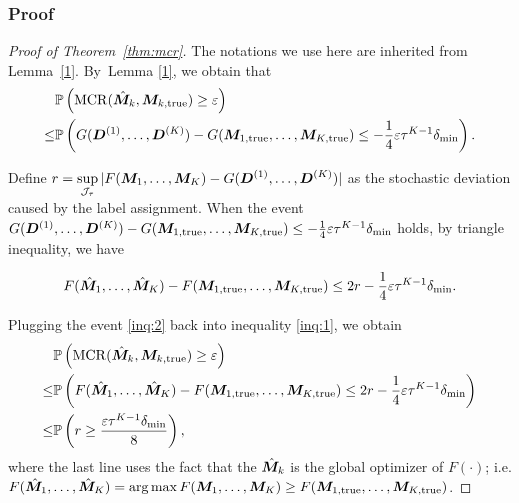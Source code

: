 \documentclass{article}
\DeclareMathOperator*{\mcr}{MCR}
\begin{document}
\begin{appendices}
\subsubsection{Proof}
\begin{proof}[Proof of Theorem~\ref{thm:mcr}]
The notations we use here are inherited from Lemma~\ref{1}. By~Lemma \ref{1}, we obtain that
\begin{align}\label{inq:1}
   &\mathbb{P}\left(\mcr(\hat{\mM}_k, \mM_{k,\text{true}})\geq \varepsilon\right)\notag \\
\leq & \mathbb{P}\left(G(\mD^{(1)},\ldots,\mD^{(K)})-G(\mM_{1,\text{true}},\ldots,\mM_{K,\text{true}})\leq -\frac{1}{4}\varepsilon\tau^{K-1}\delta_{\min}\right).
\end{align}


Define $r=\displaystyle\sup_{\mathcal{J}_\tau} |F(\bm M_1,\ldots,\bm M_K)-G(\bm{D}^{(1)},\ldots,\bm{D}^{(K)})|$ as the stochastic deviation caused by the label assignment. When the event $G(\bm{D}^{(1)},\ldots,\bm{D}^{(K)})-G(\bm M_{1,\text{true}},\ldots,\bm M_{K,\text{true}})\leq -\frac{1}{4}\varepsilon\tau^{K-1}\delta_{\min}$ holds, by triangle inequality, we have

\begin{equation} \label{inq:2}
F(\hat{\bm M}_1,\ldots,\hat{\bm M}_K)-F(\bm M_{1,\text{true}},\ldots,\bm M_{K,\text{true}})\leq  2r-\frac{1}{4}\varepsilon\tau^{K-1}\delta_{\min}.
\end{equation}

Plugging the event \eqref{inq:2} back into inequality \eqref{inq:1}, we obtain
\begin{align}\label{inq:3}
    &\mathbb{P}\left(\mcr(\hat{\mM}_k, \mM_{k,\text{true}})\geq \varepsilon\right)\notag \\
    \leq & \mathbb{P}\left(F(\hat{\mM}_1,\ldots,\hat{\mM}_K)-F(\mM_{1,\text{true}},\ldots,\mM_{K,\text{true}})\leq 2r-\frac{1}{4}\varepsilon\tau^{K-1}\delta_{\min}\right)\notag \\
    \leq & \mathbb{P}\left(r \geq\frac{\varepsilon\tau^{K-1}\delta_{\min}}{8}\right),
\end{align}
where the last line uses the fact that the ${\hat{\bm M}_k}$ is the global optimizer of $F(\cdot)$; i.e. $F(\hat{\bm M}_1,\ldots,\hat {\bm M}_K)=\arg\max F(\bm M_1,\ldots,\bm M_K)\geq F(\bm M_{1,\text{true}},\ldots, \bm M_{K,\text{true}})$.



\end{proof}
\end{appendices}
\end{document}
